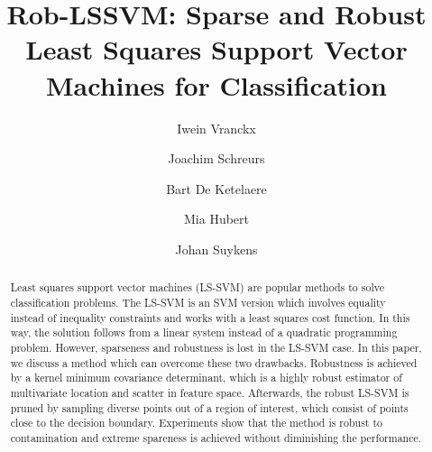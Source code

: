\documentclass[preprint,12pt]{elsarticle}
\begin{document}
	
	\begin{frontmatter}
		
		\title{Rob-LSSVM: Sparse and Robust Least Squares Support Vector Machines for Classification}
		
		
		
		
		
		\author[statistics]{Iwein Vranckx}
		
		\author[stadius]{Joachim Schreurs}
		\author[mebios]{Bart De Ketelaere}
		\author[statistics]{Mia Hubert}
		\author[stadius]{Johan Suykens}
		\address[statistics]{KU Leuven, Department of Mathematics and LStat, Celestijnenlaan 200B, BE-3001 Heverlee, Belgium}
		\address[stadius]{KU Leuven, ESAT-STADIUS, Kasteelpark Arenberg 10, BE-3001 Heverlee, Belgium}
		\address[mebios]{KU Leuven, Division of Mechatronics, Biostatistics and Sensors, Kasteelpark Arenberg 30, BE-3001 Heverlee, Belgium}
		
		\begin{abstract}
			Least squares support vector machines (LS-SVM) are popular methods to solve classification problems. The LS-SVM is an SVM version which involves equality instead of inequality constraints and works with a least squares cost function.
			In this way, the solution follows from a linear system instead of a quadratic programming problem. However, sparseness  and robustness is lost in the LS-SVM case. In this paper, we discuss a method which can overcome these two drawbacks. Robustness is achieved by a kernel minimum covariance determinant, which is a highly robust estimator of multivariate location and scatter in feature space. Afterwards, the robust LS-SVM is pruned by sampling diverse points out of a region of interest, which consist of points close to the decision boundary.	Experiments show that the method is robust to contamination and extreme spareness is achieved without diminishing the performance. 
			

\end{abstract}
\end{frontmatter}
\end{document}
